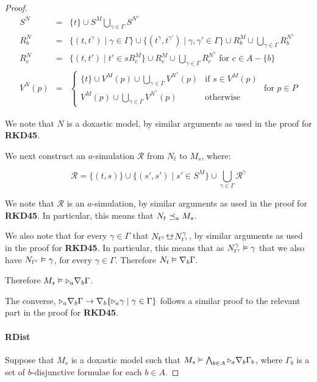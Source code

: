 \begin{proof}
\begin{eqnarray*}
S^N &=& \{t\} \cup S^M \bigcup_{\gamma \in \Gamma} S^{N^\gamma}\\
R^N_b &=& \{(t, t^\gamma) \mid \gamma \in \Gamma\} \cup \{(t^\gamma,
t^{\gamma'}) \mid \gamma, \gamma' \in \Gamma\} \cup R^M_b \cup \bigcup_{\gamma
\in \Gamma} R^{N^\gamma}_b\\
R^N_c &=& \{(t, t') \mid t' \in sR^M_c\} \cup R^M_c \cup \bigcup_{\gamma \in
\Gamma} R^{N^\gamma}_c \text{ for $c \in A - \{b\}$}\\
V^N(p) &=& 
\begin{cases}
\{t\} \cup V^M(p) \cup \bigcup_{\gamma \in \Gamma} V^{N^\gamma}(p) & \text{if $s
\in V^M(p)$}\\
V^M(p) \cup \bigcup_{\gamma \in \Gamma} V^{N^\gamma}(p) & \text{otherwise}
\end{cases}
\text{ for $p \in P$}
\end{eqnarray*}

We note that $N$ is a doxastic model, by similar arguments as used in the proof
for {\bf RKD45}.

We next construct an $a$-simulation $\mathcal{R}$ from $N_t$ to $M_s$, where:

$$\mathcal{R} = \{(t, s)\} \cup \{(s', s') \mid s' \in S^M\} \cup \bigcup_{\gamma \in \Gamma} \mathcal{R}^\gamma$$

We note that $\mathcal{R}$ is an $a$-simulation, by similar arguments as used in
the proof for {\bf RKD45}. In particular, this means that $N_t \preceq_a
M_s$.

We also note that for every $\gamma \in \Gamma$ that $N_{t^\gamma} \bisim
N^\gamma_{t^\gamma}$, by similar arguments as used in the proof for {\bf RKD45}.
In particular, this means that as $N^\gamma_{t^\gamma} \vDash \gamma$ that we
also have $N_{t^\gamma} \vDash \gamma$, for every $\gamma \in \Gamma$.
Therefore $N_t \vDash \nabla_b \Gamma$.

Therefore $M_s \vDash {\ensuremath{\mathopen{\triangleright}}}_a \nabla_b \Gamma$.

The converse, ${\mathopen{\triangleright}}_a \nabla_b \Gamma \rightarrow \nabla_b \{{\mathopen{\triangleright}}_a
\gamma \mid \gamma \in \Gamma\}$ follows a similar proof to the relevant part in
the proof for {\bf RKD45}.

\paragraph{RDist} Suppose that $M_s$ is a doxastic model such that $M_s
\vDash \bigwedge_{b \in A} {\mathopen{\triangleright}}_a \nabla_b \Gamma_b$, where $\Gamma_b$
is a set of $b$-disjunctive formulae for each $b \in A$.


\end{proof}
